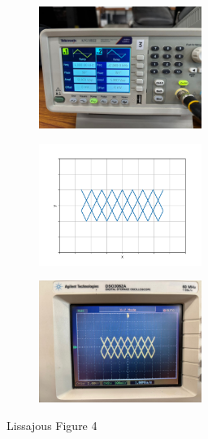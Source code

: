 \documentclass[a4paper,12pt]{article}
\begin{document}
\begin{figure}[h!]
	\begin{subfigure}[b]{10pt}
		\includegraphics[width = 150pt]{figs/fig4.jpeg}
	\end{subfigure}
	\hspace{120pt}
	\begin{subfigure}[b]{10pt}
		\includegraphics[width = 150pt]{figs/fig4.png}
	\end{subfigure}
	\hspace{130pt}
	\begin{subfigure}[b]{10pt}
		\includegraphics[width = 150pt]{figs/fig4_1.jpeg}
	\end{subfigure}
	\caption{Lissajous Figure 4}
\end{figure}
\end{document}
